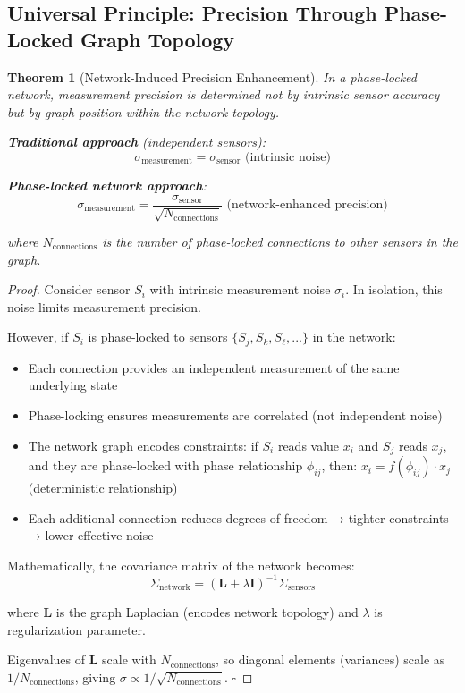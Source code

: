 \documentclass[11pt,a4paper]{article}
\newtheorem{theorem}{Theorem}[section]
\theoremstyle{definition}
\theoremstyle{remark}
\begin{document}
\subsection{Universal Principle: Precision Through Phase-Locked Graph Topology}

\begin{theorem}[Network-Induced Precision Enhancement]
\label{thm:network_precision}
In a phase-locked network, measurement precision is determined not by intrinsic sensor accuracy but by \textit{graph position} within the network topology.

\textbf{Traditional approach} (independent sensors):
\begin{equation}
\sigma_{\text{measurement}} = \sigma_{\text{sensor}} \text{ (intrinsic noise)}
\end{equation}

\textbf{Phase-locked network approach}:
\begin{equation}
\sigma_{\text{measurement}} = \frac{\sigma_{\text{sensor}}}{\sqrt{N_{\text{connections}}}} \text{ (network-enhanced precision)}
\end{equation}

where $N_{\text{connections}}$ is the number of phase-locked connections to other sensors in the graph.
\end{theorem}

\begin{proof}
Consider sensor $S_i$ with intrinsic measurement noise $\sigma_i$. In isolation, this noise limits measurement precision.

However, if $S_i$ is phase-locked to sensors $\{S_j, S_k, S_\ell, ...\}$ in the network:
\begin{itemize}
\item Each connection provides an independent measurement of the same underlying state
\item Phase-locking ensures measurements are correlated (not independent noise)
\item The network graph encodes constraints: if $S_i$ reads value $x_i$ and $S_j$ reads $x_j$, and they are phase-locked with phase relationship $\phi_{ij}$, then: $x_i = f(\phi_{ij}) \cdot x_j$ (deterministic relationship)
\item Each additional connection reduces degrees of freedom → tighter constraints → lower effective noise
\end{itemize}

Mathematically, the covariance matrix of the network becomes:
\begin{equation}
\Sigma_{\text{network}} = (\mathbf{L} + \lambda \mathbf{I})^{-1} \Sigma_{\text{sensors}}
\end{equation}

where $\mathbf{L}$ is the graph Laplacian (encodes network topology) and $\lambda$ is regularization parameter.

Eigenvalues of $\mathbf{L}$ scale with $N_{\text{connections}}$, so diagonal elements (variances) scale as $1/N_{\text{connections}}$, giving $\sigma \propto 1/\sqrt{N_{\text{connections}}}$. $\square$
\end{proof}
\end{document}
